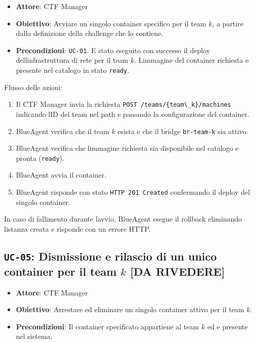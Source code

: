 \begin{itemize}
\tightlist
\item
  \textbf{Attore}: CTF Manager
\item
  \textbf{Obiettivo}: Avviare un singolo container specifico per il team
  \(k\), a partire dalla definizione della challenge che lo contiene.
\item
  \textbf{Precondizioni}: \passthrough{\lstinline!UC-01!}.
  E\textquotesingle{} stato eseguito con successo il deploy
  dell\textquotesingle infrastruttura di rete per il team \(k\).
  L\textquotesingle immagine del container richiesta e\textquotesingle{}
  presente nel catalogo in stato \passthrough{\lstinline!ready!}.
\end{itemize}

Flusso delle azioni:

\begin{enumerate}
\def\labelenumi{\arabic{enumi}.}
\tightlist
\item
  Il CTF Manager invia la richiesta
  \passthrough{\lstinline!POST /teams/\{team\_k\}/machines!} indicando
  l\textquotesingle ID del team nel path e passando la configurazione
  del container.
\item
  BlueAgent verifica che il team \(k\) esista e che il bridge
  \passthrough{\lstinline!br-team-k!} sia attivo.
\item
  BlueAgent verifica che l\textquotesingle immagine richiesta sia
  disponibile nel catalogo e pronta (\passthrough{\lstinline!ready!}).
\item
  BlueAgent avvia il container.
\item
  BlueAgent risponde con stato
  \passthrough{\lstinline!HTTP 201 Created!} confermando il deploy del
  singolo container.
\end{enumerate}

In caso di fallimento durante l\textquotesingle avvio, BlueAgent esegue
il rollback eliminando l\textquotesingle istanza creata e risponde con
un errore HTTP.

\subsection{\texorpdfstring{\texttt{UC-05}: Dismissione e rilascio di un
unico container per il team \(k\) {[}DA
RIVEDERE{]}}{UC-05: Dismissione e rilascio di un unico container per il team k {[}DA RIVEDERE{]}}}\label{uc-05-dismissione-e-rilascio-di-un-unico-container-per-il-team-k-da-rivedere}

\begin{itemize}
\tightlist
\item
  \textbf{Attore}: CTF Manager
\item
  \textbf{Obiettivo}: Arrestare ed eliminare un singolo container attivo
  per il team \(k\).
\item
  \textbf{Precondizioni}: Il container specificato appartiene al team
  \(k\) ed e\textquotesingle{} presente nel sistema.
\end{itemize}

